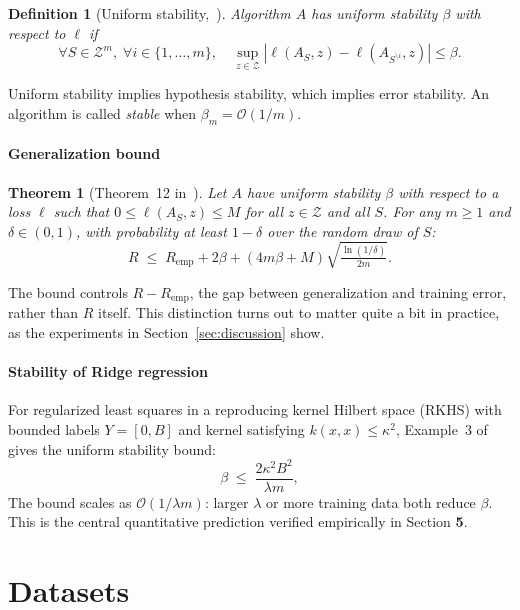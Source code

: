 \documentclass[11pt, a4paper, twoside]{article}
\newtheorem{definition}{Definition}
\newtheorem{theorem}{Theorem}
\newcommand{\abs}[1]{\left| #1 \right|}
\newcommand{\AS}{A_S}
\newcommand{\ASi}{A_{S^{\setminus i}}}
\begin{document}
\begin{definition}[Uniform stability,~\cite{bousquet2002}]
Algorithm $A$ has \emph{uniform stability} $\beta$ with respect to $\ell$ if
\[
    \forall S \in \mathcal{Z}^m,\; \forall i \in \{1,\ldots,m\},\quad
    \sup_{z \in \mathcal{Z}} \abs{\ell(\AS, z) - \ell(\ASi, z)} \leq \beta.
\]
\end{definition}

Uniform stability implies hypothesis stability, which implies error stability.
An algorithm is called \emph{stable} when $\beta_m = \mathcal{O}(1/m)$.

\paragraph{Generalization bound}

\begin{theorem}[Theorem~12 in~\cite{bousquet2002}]
Let $A$ have uniform stability $\beta$ with respect to a loss $\ell$ such that
$0 \leq \ell(\AS, z) \leq M$ for all $z \in \mathcal{Z}$ and all $S$.
For any $m \geq 1$ and $\delta \in (0,1)$, with probability at least $1-\delta$
over the random draw of $S$:
\[
    R \;\leq\; R_\text{emp} + 2\beta +
    (4m\beta + M)\sqrt{\tfrac{\ln(1/\delta)}{2m}}.
\]
\end{theorem}

The bound controls $R - R_\text{emp}$, the gap between
generalization and training error, rather than $R$ itself.
This distinction turns out to matter quite a bit in practice, as the experiments in
Section~\ref{sec:discussion} show.

\paragraph{Stability of Ridge regression}
For regularized least squares in a reproducing kernel Hilbert space (RKHS) with bounded
labels $Y = [0, B]$ and kernel satisfying $k(x,x) \leq \kappa^2$, Example~3
of~\cite{bousquet2002} gives the uniform stability bound:
\[
    \beta \;\leq\; \frac{2\kappa^2 B^2}{\lambda m},
\]
The bound scales as $\mathcal{O}(1/\lambda m)$: larger $\lambda$ or more training
data both reduce $\beta$. This is the central quantitative prediction verified
empirically in Section \textbf{5}.

\section{Datasets}
\end{document}
